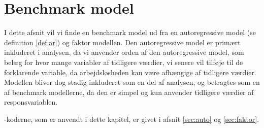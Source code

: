 \chapter{Benchmark model}
I dette afsnit vil vi finde en benchmark model ud fra en autoregressive model (se definition \ref{def:ar}) og faktor modellen. 
Den autoregressive model er primært inkluderet i analysen, da vi anvender orden af den autoregressive model, som belæg for hvor mange variabler af tidligere værdier, vi senere vil tilføje til de forklarende variable, da arbejdsløsheden kan være afhængige af tidligere værdier. 
Modellen bliver dog stadig inkluderet som en del af analysen, og betragtes som en af benchmark modellerne, da den er simpel og kun anvender tidligere værdier af responsvariablen.

\Rlang-koderne, som er anvendt i dette kapitel, er givet i afsnit \ref{sec:auto} og \ref{sec:faktor}.





